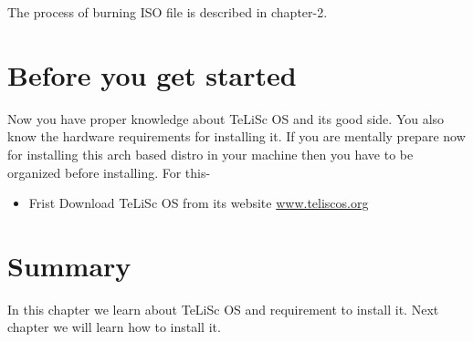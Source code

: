 The process of burning ISO file is described in chapter-2. 


\section{Before you get started}
\label{sec:1.6}
Now you have proper knowledge about TeLiSc OS and its good side. You also know the hardware requirements for installing it. If you are mentally prepare now for installing this arch based distro in your machine then you have to be organized before installing. For this-

\begin{itemize}
    \item Frist Download TeLiSc OS from its website \url{www.teliscos.org}
\end{itemize}
\section{Summary} 
\label{sec:1.7}
In this chapter  we learn about TeLiSc OS and requirement to install it. Next chapter we will learn how to install it.



















